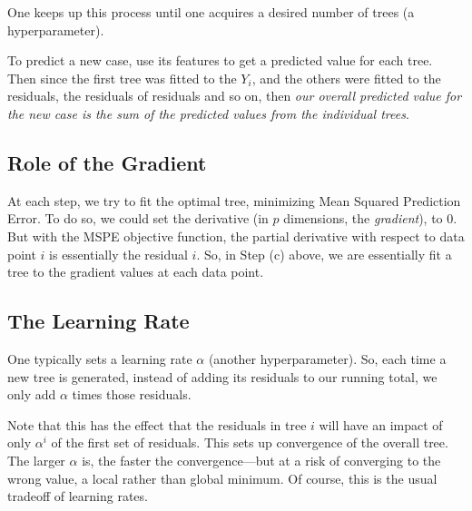 One keeps up this process until one acquires a desired number of trees
(a hyperparameter).  

To predict a new case, use its features to get a predicted value for
each tree.  Then since the first tree was fitted to the $Y_i$, and the
others were fitted to the residuals, the residuals of residuals and so
on, then \textit{our overall predicted value for the new case is the sum
of the predicted values from the individual trees}.

% 
% 
% 
% 

\subsection{Role of the Gradient}

At each step, we try to fit the optimal tree, minimizing Mean
Squared Prediction Error.  To do so, we could set the derivative (in $p$ 
dimensions, the \textit{gradient}), to 0.  But with the MSPE objective
function, the partial derivative with respect to data point $i$
is essentially the residual $i$.  So, in Step (c) above, we are
essentially fit a tree to the gradient values at each data point.

\subsection{The Learning Rate}

One typically sets a learning rate $\alpha$ (another hyperparameter).
So, each time a new tree is generated, instead of adding its residuals
to our running total, we only add $\alpha$ times those residuals.  

Note that this has the effect that the residuals in tree $i$ will have
an impact of only $\alpha^i$ of the first set of residuals.  This sets
up convergence of the overall tree.  The larger $\alpha$ is, the faster
the convergence---but at a risk of converging to the wrong value, a
local rather than global minimum.  Of course, this is the usual tradeoff
of learning rates.

